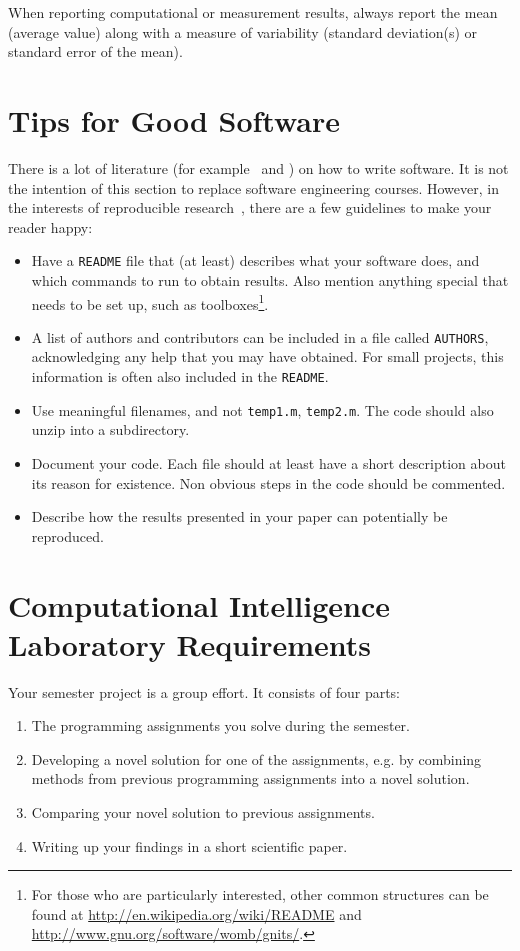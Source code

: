 \documentclass[10pt,conference,compsocconf]{IEEEtran}
\begin{document}
When reporting computational or measurement results, always
report the mean (average value) along with a measure of variability
(standard deviation(s) or standard error of the mean).


\section{Tips for Good Software}
\label{sec:tips-software}

There is a lot of literature (for example~\cite{hunt99pragmatic} and
\cite{spolsky04software}) on how to write software. It is not the
intention of this section to replace software engineering
courses. However, in the interests of reproducible
research~\cite{schwab00}, there are a few guidelines to make your
reader happy:
\begin{itemize}
\item Have a \texttt{README} file that (at least) describes what your
  software does, and which commands to run to obtain results. Also
  mention anything special that needs to be set up, such as
  toolboxes\footnote{For those who are
  particularly interested, other common structures can be found at
  \url{http://en.wikipedia.org/wiki/README} and
  \url{http://www.gnu.org/software/womb/gnits/}.}.
\item A list of authors and contributors can be included in a file
  called \texttt{AUTHORS}, acknowledging any help that you may have
  obtained. For small projects, this information is often also
  included in the \texttt{README}.
\item Use meaningful filenames, and not \texttt{temp1.m},
  \texttt{temp2.m}. The code should also unzip into a subdirectory.
\item Document your code. Each file should at least have a short
  description about its reason for existence. Non obvious steps in the
  code should be commented.
\item Describe how the results presented in your paper can potentially
  be reproduced.
\end{itemize}


\section{Computational Intelligence Laboratory Requirements}
\label{sec:cil}

Your semester project is a group effort. It consists of four parts:
\begin{enumerate}
\item The programming assignments you solve during the semester.
\item Developing a novel solution for one of the assignments, e.g. by
  combining methods from previous programming assignments into a novel
  solution.
\item Comparing your novel solution to previous assignments.
\item Writing up your findings in a short scientific paper.
\end{enumerate}
\end{document}

